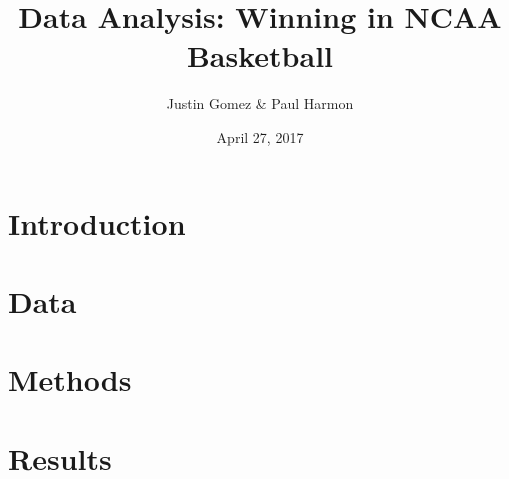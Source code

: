 \documentclass{beamer}
\title[NCAA Basketball]{Data Analysis: Winning in NCAA Basketball}
\author{Justin Gomez \& Paul Harmon}
\date{April 27, 2017}
\begin{document}
	
	\begin{frame}
		\titlepage
	\end{frame}
	

	\section{Introduction}
	
	\section{Data}
	
	\section{Methods}
	
	\section{Results}
	
\end{document}
